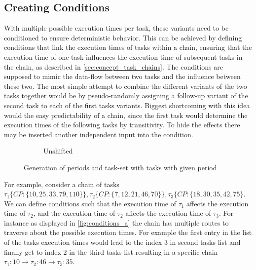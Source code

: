 \subsection{Creating Conditions}\label{sec:creating_conditions}
With multiple possible execution times per task, these variants need to be conditioned to ensure deterministic behavior.
This can be achieved by defining conditions that link the execution times of tasks within a chain, ensuring that the execution time of one task influences the execution time of subsequent tasks in the chain, as described in \cref{sec:concept_task_chains}.
The conditions are supposed to mimic the data-flow between two tasks and the influence between these two.
The most simple attempt to combine the different variants of the two tasks together would be by pseudo-randomly assigning a follow-up variant of the second task to each of the first tasks variants.
Biggest shortcoming with this idea would the easy predictability of a chain, since the first task would determine the execution times of the following tasks by transitivity.
To hide the effects there may be inserted another independent input into the condition.


\begin{figure}[ht]
	\begin{subfigure}[c]{0.45\textwidth}
		\resizebox{\textwidth}{!}{%
			\label{fig:conditions_a}
			
		}
		\caption{Unshifted}
	\end{subfigure}
	\caption{Generation of periods and task-set with tasks with given period}
\end{figure}

For example, consider a chain of tasks \( \tau_1 \{ CP: \{10,25,33,79,110\}\}, \tau_2 \{ CP: \{7,12,21,46,70\}\}, \tau_3 \{CP: \{18,30,35,42,75\} \).
We can define conditions such that the execution time of \( \tau_1 \) affects the execution time of \( \tau_2 \), and the execution time of \( \tau_2 \) affects the execution time of \( \tau_3 \). 
For instance as displayed in \cref{fig:conditions_a} the chain has multiple routes to traverse about the possible execution times.
For example the first entry in the list of the tasks execution times would lead to the index 3 in second tasks list and finally get to index 2 in the third tasks list resulting in a specific chain \( \tau_1: 10 \rightarrow \tau_2: 46 \rightarrow \tau_3: 35 \).

